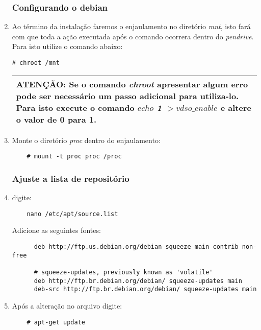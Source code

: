 \documentclass[a4paper,10pt]{article}
\begin{document}
\begin{enumerate}
    \subsubsection{Configurando o debian}
    \item Ao término da instalação faremos o enjaulamento no diretório \emph{mnt}, isto fará com que 
	toda a ação executada após o comando ocorrera dentro do \emph{pendrive}. Para isto utilize o 
	comando abaixo:
	  \begin{lstlisting}[frame=single]
	  # chroot /mnt
	  \end{lstlisting}
	  \begin{center}
	    \begin{tabular}{|p{7cm}|}
	      \hline
		\textbf{ATENÇÃO}: Se o comando \emph{chroot} apresentar algum erro pode ser necessário um 
		passo adicional para utiliza-lo. Para isto execute o comando \emph{$echo$ 1 $> vdso\_enable$} 
		e altere o valor de 0 para 1.\\
	      \hline
	    \end{tabular}
	  \end{center}

    \item Monte o diretório \emph{proc} dentro do enjaulamento:
      \begin{lstlisting}
	# mount -t proc proc /proc
      \end{lstlisting}

    \subsubsection{Ajuste a lista de repositório}
    \item digite:
      \begin{lstlisting}
	nano /etc/apt/source.list
      \end{lstlisting}
      Adicione as seguintes fontes:
	\begin{lstlisting}
	  deb http://ftp.us.debian.org/debian squeeze main contrib non-free

	  # squeeze-updates, previously known as 'volatile'
	  deb http://ftp.br.debian.org/debian/ squeeze-updates main
	  deb-src http://ftp.br.debian.org/debian/ squeeze-updates main
	\end{lstlisting}

    \item Após a alteração no arquivo digite:
      \begin{lstlisting}
	# apt-get update
      \end{lstlisting}


\end{enumerate}
\end{document}
